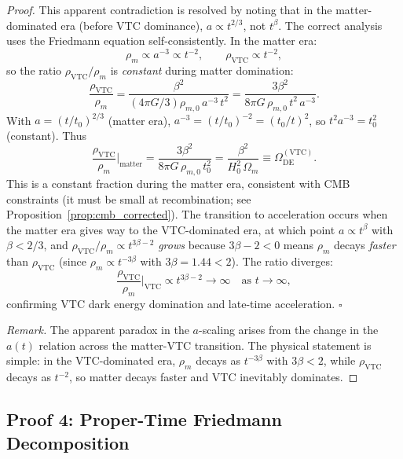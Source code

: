 \documentclass[11pt,a4paper]{article}
\theoremstyle{definition}
\newcommand{\VTC}{\mathrm{VTC}}
\newcommand{\DE}{\mathrm{DE}}
\begin{document}
\begin{proof}
This apparent contradiction is resolved by noting that in the matter-dominated era (before VTC dominance), $a \propto t^{2/3}$, not $t^\beta$. The correct analysis uses the Friedmann equation self-consistently. In the matter era:
\begin{equation}
\rho_m \propto a^{-3} \propto t^{-2}, \qquad \rho_{\VTC} \propto t^{-2},
\end{equation}
so the ratio $\rho_{\VTC}/\rho_m$ is \textit{constant} during matter domination:
\begin{equation}
\frac{\rho_{\VTC}}{\rho_m} = \frac{\beta^2}{(4\pi G/3)\rho_{m,0}\,a^{-3}\,t^2} = \frac{3\beta^2}{8\pi G\,\rho_{m,0}\,t^2\,a^{-3}}.
\end{equation}
With $a = (t/t_0)^{2/3}$ (matter era), $a^{-3} = (t/t_0)^{-2} = (t_0/t)^2$, so $t^2 a^{-3} = t_0^2$ (constant). Thus
\begin{equation}
\frac{\rho_{\VTC}}{\rho_m}\bigg|_{\mathrm{matter}} = \frac{3\beta^2}{8\pi G\,\rho_{m,0}\,t_0^2} = \frac{\beta^2}{H_0^2\,\Omega_m} \equiv \Omega_{\DE}^{(\VTC)}.
\end{equation}
This is a constant fraction during the matter era, consistent with CMB constraints (it must be small at recombination; see Proposition~\ref{prop:cmb_corrected}). The transition to acceleration occurs when the matter era gives way to the VTC-dominated era, at which point $a \propto t^\beta$ with $\beta < 2/3$, and $\rho_{\VTC}/\rho_m \propto t^{3\beta - 2}$ \textit{grows} because $3\beta - 2 < 0$ means $\rho_m$ decays \textit{faster} than $\rho_{\VTC}$ (since $\rho_m \propto t^{-3\beta}$ with $3\beta = 1.44 < 2$). The ratio diverges:
\begin{equation}
\frac{\rho_{\VTC}}{\rho_m}\bigg|_{\VTC} \propto t^{3\beta - 2} \to \infty \quad \text{as } t \to \infty,
\end{equation}
confirming VTC dark energy domination and late-time acceleration. $\square$

\textit{Remark.} The apparent paradox in the $a$-scaling arises from the change in the $a(t)$ relation across the matter-VTC transition. The physical statement is simple: in the VTC-dominated era, $\rho_m$ decays as $t^{-3\beta}$ with $3\beta < 2$, while $\rho_{\VTC}$ decays as $t^{-2}$, so matter decays faster and VTC inevitably dominates.
\end{proof}

\subsection{Proof 4: Proper-Time Friedmann Decomposition}
\label{sec:thm3_proper_time}
\end{document}
